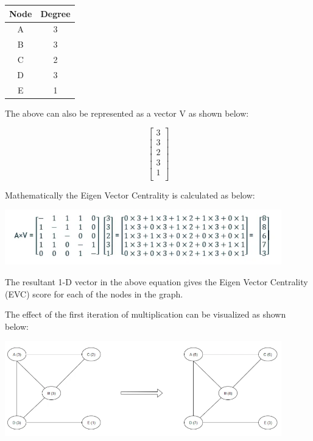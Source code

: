 \documentclass[12pt, a4paper]{article}
\begin{document}
\begin{flushleft}
    \begin{table}
    \centering
    \begin{tabular}{|c|c|}
    \hline
    Node & Degree \\
    \hline
    A & 3 \\
    B & 3 \\
    C & 2 \\ 
    D & 3 \\
    E & 1 \\
    \hline
    \end{tabular}
    \end{table}
    
    The above can also be represented as a vector V as shown below:

    \begin{equation*}
    \begin{bmatrix}
    3 \\
    3 \\
    2 \\
    3 \\
    1 \\
    \end{bmatrix}
    \end{equation*}

    Mathematically the Eigen Vector Centrality is calculated as below:

    \includegraphics[width=0.9\textwidth,center]{Multiplication}

    The resultant 1-D vector in the above equation gives the Eigen Vector Centrality (EVC) score for each of the nodes in the graph.

    The effect of the first iteration of multiplication can be visualized as shown below:

    \includegraphics[width=0.9\textwidth,center]{Transform}


\end{flushleft}
\end{document}
